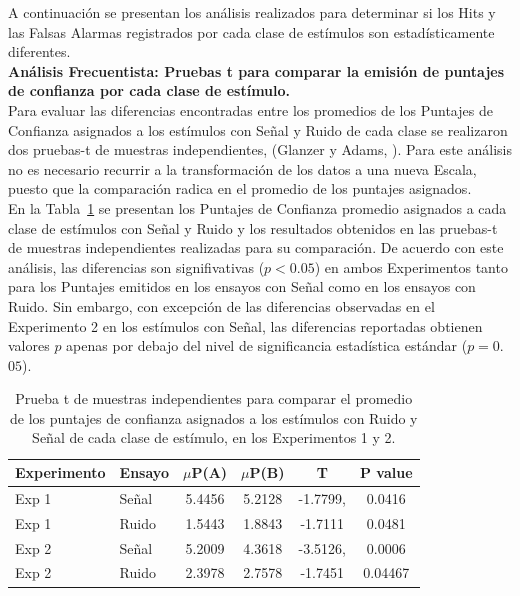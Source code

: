 A continuación se presentan los análisis realizados para determinar si los Hits y las Falsas Alarmas registrados por cada clase de estímulos son estadísticamente diferentes.\\

\textbf{Análisis Frecuentista: Pruebas t para comparar la emisión de puntajes de confianza por cada clase de estímulo.}\\

Para evaluar las diferencias encontradas entre los promedios de los Puntajes de Confianza asignados a los estímulos con Señal y Ruido de cada clase se realizaron  dos pruebas-t de muestras independientes, (Glanzer y Adams, \citeyear{Glanzer1990}). Para este análisis no es necesario recurrir a la transformación de los datos a una nueva Escala, puesto que la comparación radica en el promedio de los puntajes asignados.\\

En la Tabla~\ref{Tabla_t-Confidence} se presentan los Puntajes de Confianza promedio asignados a cada clase de estímulos con Señal y Ruido y los resultados obtenidos en las pruebas-t de muestras independientes realizadas para su comparación. De acuerdo con este análisis, las diferencias son signifivativas ($p<0.05$) en ambos Experimentos tanto para los Puntajes emitidos  en los ensayos con Señal como en los ensayos con Ruido. Sin embargo, con excepción de las diferencias observadas en el Experimento 2 en los estímulos con Señal, las diferencias reportadas obtienen valores $p$ apenas por debajo del nivel de significancia estadística estándar ($p=0$.$05$).\\

\begin{table}[h]
\caption[Prueba t para evaluar las diferencias entre los puntajes de confianza asignados en promedio a los estímulos con señal y ruido de cada clase]{Prueba t de muestras independientes para comparar el promedio de los puntajes de confianza asignados a los estímulos con Ruido y Señal de cada clase de estímulo, en los Experimentos 1 y 2.}
\label{Tabla_t-Confidence}
\centering
\begin{tabular}{l l |  c c c c}
\toprule
\textbf{Experimento} & \textbf{Ensayo} & \textbf{$\mu$P(A)} & \textbf{$\mu$P(B)} & \textbf{T} & \textbf{P value}\\
\midrule
Exp 1 & Señal & 5.4456 & 5.2128 & -1.7799, & 0.0416 \\
Exp 1 & Ruido & 1.5443 & 1.8843 & -1.7111 & 0.0481 \\
Exp 2 & Señal & 5.2009 & 4.3618  & -3.5126, & 0.0006 \\
Exp 2 & Ruido & 2.3978 & 2.7578 & -1.7451 & 0.04467 \\
\bottomrule
\end{tabular}
\end{table}

